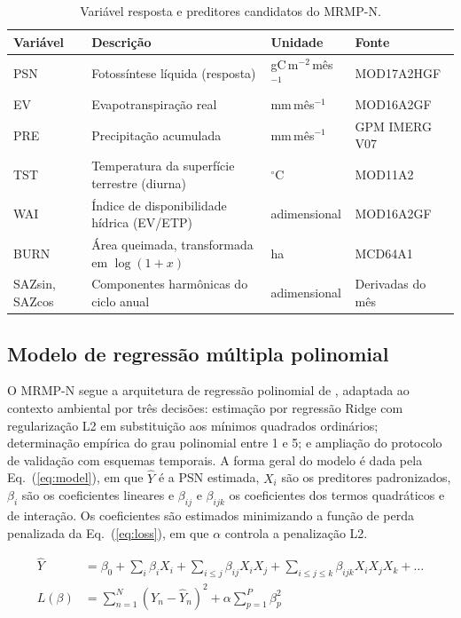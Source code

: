 \documentclass[a4paper,fleqn]{cas-sc}
\begin{document}
\begin{table}[htbp]
\caption{Variável resposta e preditores candidatos do MRMP-N.}\label{tbl:vars}
\begin{tabular*}{\tblwidth}{@{}LLLL@{}}
\toprule
Variável & Descrição & Unidade & Fonte \\
\midrule
PSN & Fotossíntese líquida (resposta) & gC\,m$^{-2}$\,mês$^{-1}$ & MOD17A2HGF \\
EV & Evapotranspiração real & mm\,mês$^{-1}$ & MOD16A2GF \\
PRE & Precipitação acumulada & mm\,mês$^{-1}$ & GPM IMERG V07 \\
TST & Temperatura da superfície terrestre (diurna) & $^\circ$C & MOD11A2 \\
WAI & Índice de disponibilidade hídrica (EV/ETP) & adimensional & MOD16A2GF \\
BURN & Área queimada, transformada em $\log(1+x)$ & ha & MCD64A1 \\
SAZsin, SAZcos & Componentes harmônicas do ciclo anual & adimensional & Derivadas do mês \\
\bottomrule
\end{tabular*}
\end{table}

\subsection{Modelo de regressão múltipla polinomial}

O MRMP-N segue a arquitetura de regressão polinomial de \citet{guimaraes2024}, adaptada ao contexto ambiental por três decisões: estimação por regressão Ridge com regularização L2 em substituição aos mínimos quadrados ordinários; determinação empírica do grau polinomial entre 1 e 5; e ampliação do protocolo de validação com esquemas temporais. A forma geral do modelo é dada pela Eq.~(\ref{eq:model}), em que $\hat{Y}$ é a PSN estimada, $X_i$ são os preditores padronizados, $\beta_i$ são os coeficientes lineares e $\beta_{ij}$ e $\beta_{ijk}$ os coeficientes dos termos quadráticos e de interação. Os coeficientes são estimados minimizando a função de perda penalizada da Eq.~(\ref{eq:loss}), em que $\alpha$ controla a penalização L2.
\noindent\begin{minipage}{\columnwidth}
\begin{align}
\hat{Y} &= \beta_0 + \sum_i \beta_i X_i + \sum_{i \le j} \beta_{ij} X_i X_j + \sum_{i \le j \le k} \beta_{ijk} X_i X_j X_k + \dots \label{eq:model}\\
L(\beta) &= \sum_{n=1}^{N} \left(Y_n - \hat{Y}_n\right)^2 + \alpha \sum_{p=1}^{P} \beta_p^2 \label{eq:loss}
\end{align}
\end{minipage}
\vspace{0.5\baselineskip}
\end{document}
